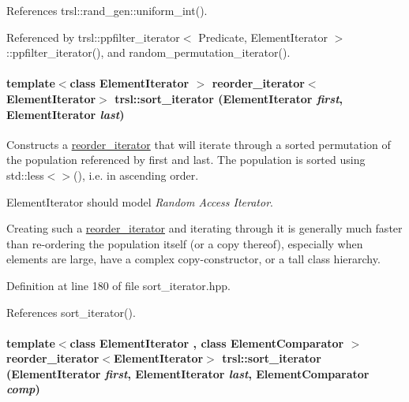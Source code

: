 References trsl::rand\_\-gen::uniform\_\-int().

Referenced by trsl::ppfilter\_\-iterator$<$ Predicate, ElementIterator $>$::ppfilter\_\-iterator(), and random\_\-permutation\_\-iterator().\hypertarget{namespacetrsl_afa98318aa74d3477b81e603fcf1c285b}{
\paragraph[{sort\_\-iterator}]{\setlength{\rightskip}{0pt plus 5cm}template$<$class ElementIterator $>$ {\bf reorder\_\-iterator}$<$ElementIterator$>$ trsl::sort\_\-iterator (ElementIterator {\em first}, \/  ElementIterator {\em last})}\hfill}
\label{namespacetrsl_afa98318aa74d3477b81e603fcf1c285b}


Constructs a \hyperlink{classtrsl_1_1reorder__iterator}{reorder\_\-iterator} that will iterate through a sorted permutation of the population referenced by {\ttfamily first} and {\ttfamily last}. The population is sorted using {\ttfamily std::less$<$$>$()}, i.e. in ascending order.

{\ttfamily ElementIterator} should model {\itshape Random Access Iterator\/}.

Creating such a \hyperlink{classtrsl_1_1reorder__iterator}{reorder\_\-iterator} and iterating through it is generally much faster than re-\/ordering the population itself (or a copy thereof), especially when elements are large, have a complex copy-\/constructor, or a tall class hierarchy. 

Definition at line 180 of file sort\_\-iterator.hpp.

References sort\_\-iterator().\hypertarget{namespacetrsl_aef0a3d23fddf651e4e6d01999da0e908}{
\paragraph[{sort\_\-iterator}]{\setlength{\rightskip}{0pt plus 5cm}template$<$class ElementIterator , class ElementComparator $>$ {\bf reorder\_\-iterator}$<$ElementIterator$>$ trsl::sort\_\-iterator (ElementIterator {\em first}, \/  ElementIterator {\em last}, \/  ElementComparator {\em comp})}\hfill}
\label{namespacetrsl_aef0a3d23fddf651e4e6d01999da0e908}



